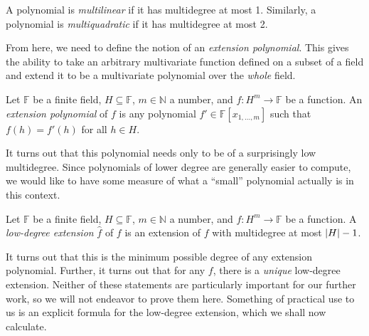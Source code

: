 \begin{defn}[{\cite[8]{AW09}}]\label{def:mlin}
  A polynomial is \emph{multilinear} if it has multidegree at most 1. Similarly,
  a polynomial is \emph{multiquadratic} if it has multidegree at most 2.
\end{defn}

From here, we need to define the notion of an \emph{extension polynomial}. This
gives the ability to take an arbitrary multivariate function defined on a subset
of a field and extend it to be a multivariate polynomial over the \emph{whole}
field.

\begin{defn}[{\cite[8]{AW09}}]\label{def:ext-poly}
  Let $\mathbb{F}$ be a finite field, $H \subseteq \mathbb{F}$, $m \in \mathbb{N}$ a number, and
  $f: H^{m} \rightarrow \mathbb{F}$ be a function. An \emph{extension polynomial} of $f$
  is any polynomial $f' \in \mathbb{F}[x_{1, \ldots, m}]$ such that $f(h) = f'(h)$ for
  all $h \in H$.
\end{defn}

It turns out that this polynomial needs only to be of a surprisingly low
multidegree. Since polynomials of lower degree are generally easier to compute,
we would like to have some measure of what a ``small'' polynomial actually is in
this context.

\begin{defn}\label{def:low-deg-ext}
  Let $\mathbb{F}$ be a finite field, $H \subseteq \mathbb{F}$, $m \in \mathbb{N}$ a number, and
  $f: H^{m} \rightarrow \mathbb{F}$ be a function. A \emph{low-degree extension} $\hat{f}$
  of $f$ is an extension of $f$ with multidegree at most $\lvert H\rvert - 1$.
\end{defn}

It turns out that this is the minimum possible degree of any extension
polynomial. Further, it turns out that for any $f$, there is a \emph{unique}
low-degree extension. Neither of these statements are particularly important for
our further work, so we will not endeavor to prove them here. Something of
practical use to us is an explicit formula for the low-degree extension, which
we shall now calculate.

